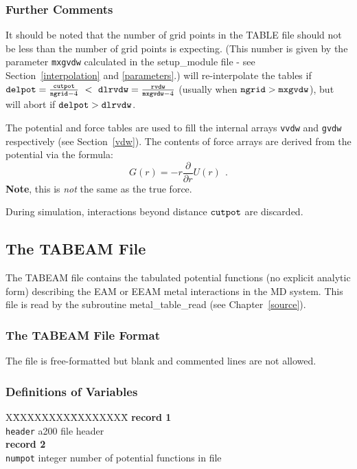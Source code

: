 \subsubsection{Further Comments}

It should be noted that the number of grid points in the TABLE file
should not be less than the number of grid points \D is expecting.
(This number is given by the parameter {\tt mxgvdw} calculated in
the {\sc setup\_module} file - see Section~\ref{interpolation} and
\ref{parameters}.)  \D will re-interpolate the tables if
${\tt delpot} = \frac{\tt cutpot}{{\tt ngrid}-4}~<~{\tt dlrvdw} = \frac{\tt rvdw}{{\tt mxgvdw}-4}$
(usually when ${\tt ngrid}>{\tt mxgvdw}$), but will abort if ${\tt delpot}>{\tt dlrvdw}$.

The potential and force tables are used to fill the internal
arrays {\tt vvdw} and {\tt gvdw} respectively (see Section~\ref{vdw}).
The contents of force arrays are derived from the potential via the formula:
\begin{equation}
G(r)=-r\frac{\partial}{\partial r}U(r)~~.
\end{equation}
{\bf Note}, this is {\em not} the same as the true force.

During simulation, interactions beyond distance ${\tt cutpot}$ are discarded.

\subsection{The TABEAM File}
\label{tabeam-file}

The TABEAM file contains the tabulated potential functions (no explicit
analytic form) describing the EAM or EEAM
metal interactions in the MD system.  This file is read by the subroutine
{\sc metal\_table\_read} (see Chapter~\ref{source}).

\subsubsection{The TABEAM File Format}

The file is free-formatted but blank and commented lines are not
allowed.

\subsubsection{Definitions of Variables}

\begin{tabbing}
X\=XXXXXXXX\=XXXXXXXX\=\kill
{\bf record 1} \\
\> {\tt header} \> a200    \> file header \\
{\bf record 2} \\
\> {\tt numpot} \> integer \> number of potential functions in file
\end{tabbing}

